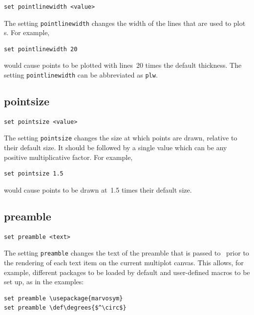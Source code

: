 \begin{verbatim}
set pointlinewidth <value>
\end{verbatim}

The setting {\tt pointlinewidth} changes the width of the lines that are used
to plot \datapoint s.  For example,

\begin{verbatim}
set pointlinewidth 20
\end{verbatim}

\noindent would cause points to be plotted with lines~20 times the default
thickness.  The setting {\tt pointlinewidth} can be abbreviated as {\tt plw}.


\subsection{pointsize}

\begin{verbatim}
set pointsize <value>
\end{verbatim}

The setting {\tt pointsize} changes the size at which points are drawn,
relative to their default size. It should be followed by a single value which
can be any positive multiplicative factor. For example,

\begin{verbatim}
set pointsize 1.5
\end{verbatim}

\noindent would cause points to be drawn at~1.5 times their default size.


\subsection{preamble}

\begin{verbatim}
set preamble <text>
\end{verbatim}

The setting {\tt preamble} changes the text of the preamble that is passed to
\latexdcf\ prior to the rendering of each text item on the current multiplot
canvas.  This allows, for example, different packages to be loaded by default
and user-defined macros to be set up, as in the examples:

\begin{verbatim}
set preamble \usepackage{marvosym}
set preamble \def\degrees{$^\circ$}
\end{verbatim}


